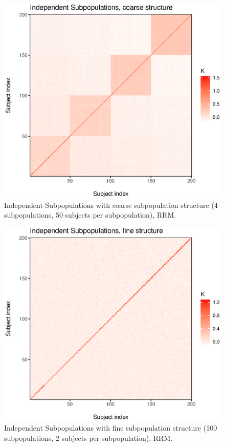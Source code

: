 \begin{figure}[H]
    \centering
    \includegraphics[scale = 1]{figures/indep_coarse_kinship.eps}
    \caption{Independent Subpopulations with coarse subpopulation structure (4 subpopulations, 50 subjects per subpopulation), RRM.}
    \label{fig:indep_coarse}
\end{figure}

\begin{figure}[H]
    \centering
    \includegraphics[scale = 1]{figures/indep_fine_kinship.eps}
    \caption{Independent Subpopulations with fine subpopulation structure (100 subpopulations, 2 subjects per subpopulation), RRM.}
    \label{fig:indep_fine}
\end{figure}


